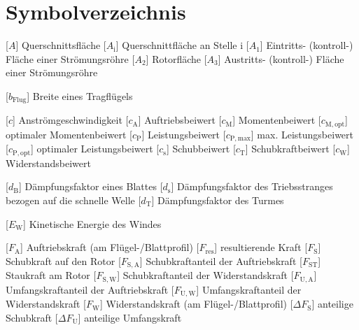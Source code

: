 \documentclass[
	pagesize,
	fontsize=12pt,
	paper=a4,
	oneside,
    reqno
]{scrartcl}
\numberwithin{equation}{section} %
\numberwithin{table}{section} %
\numberwithin{figure}{section} %
\begin{document}
\section*{Symbolverzeichnis}
\begin{acronym}[Symbols]
            [$A$]                       {Querschnittsfläche}
           [$A_{\mathrm{i}}$]          {Querschnittfläche an Stelle i}    
           [$A_{\mathrm{1}}$]          {Eintritts- (kontroll-) Fläche einer Strömungsröhre}
           [$A_{\mathrm{2}}$]          {Rotorfläche}
           [$A_{\mathrm{3}}$]          {Austritts- (kontroll-) Fläche einer Strömungsröhre}
    
        [$b_{\mathrm{Flug}}$]       {Breite eines Tragflügels}
    
            [$c$]                       {Anströmgeschwindigkeit}
           [$c_{\mathrm{A}}$]          {Auftriebsbeiwert}
           [$c_{\mathrm{M}}$]          {Momentenbeiwert}
        [$c_{\mathrm{M,opt}}$]      {optimaler Momentenbeiwert}
           [$c_{\mathrm{P}}$]          {Leistungsbeiwert}
        [$c_{\mathrm{P,max}}$]      {max. Leistungsbeiwert}
        [$c_{\mathrm{P,opt}}$]      {optimaler Leistungsbeiwert}
           [$c_{\mathrm{s}}$]          {Schubbeiwert}  
           [$c_{\mathrm{T}}$]          {Schubkraftbeiwert}
           [$c_{\mathrm{W}}$]          {Widerstandsbeiwert}

           [$d_{\mathrm{B}}$]          {Dämpfungsfaktor eines Blattes}
           [$d_{\mathrm{s}}$]          {Dämpfungsfaktor des Triebsstranges bezogen auf die schnelle Welle}
           [$d_{\mathrm{T}}$]          {Dämpfungsfaktor des Turmes}

           [$E_{\mathrm{W}}$]          {Kinetische Energie des Windes}
    
           [$F_{\mathrm{A}}$]          {Auftriebskraft (am Flügel-/Blattprofil)}
         [$F_{\mathrm{res}}$]        {resultierende Kraft}
           [$F_{\mathrm{S}}$]          {Schubkraft auf den Rotor}
          [$F_{\mathrm{S,A}}$]        {Schubkraftanteil der Auftriebskraft}
          [$F_{\mathrm{ST}}$]         {Staukraft am Rotor}
          [$F_{\mathrm{S,W}}$]        {Schubkraftanteil der Widerstandskraft}
          [$F_{\mathrm{U,A}}$]        {Umfangskraftanteil der Auftriebskraft}    
           [$F_{\mathrm{U,W}}$]        {Umfangskraftanteil der Widerstandskraft} 
           [$F_{\mathrm{W}}$]          {Widerstandskraft (am Flügel-/Blattprofil)}
      [$\Delta F_{\mathrm{S}}$]   {anteilige Schubkraft}    
      [$\Delta F_{\mathrm{U}}$]   {anteilige Umfangskraft}


\end{acronym}
\end{document}
